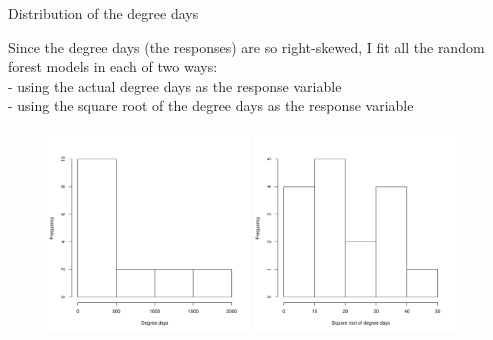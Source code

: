 \documentclass{beamer}
\begin{document}
\begin{frame}{Distribution of the degree days}

  {\scriptsize
  
    \noindent Since the degree days (the responses) are so
    right-skewed, I fit all the random forest models in each of two ways:\\
    - using the actual degree days as the response variable\\
    - using the square root of the degree days as the response variable

    
\begin{figure}
  \includegraphics[width=2.1in]{degdays_all_time_steps_hist}
  \includegraphics[width=2.1in]{sqrt_degdays_all_time_steps_hist}
\end{figure}
  }
  
\end{frame}
\end{document}
